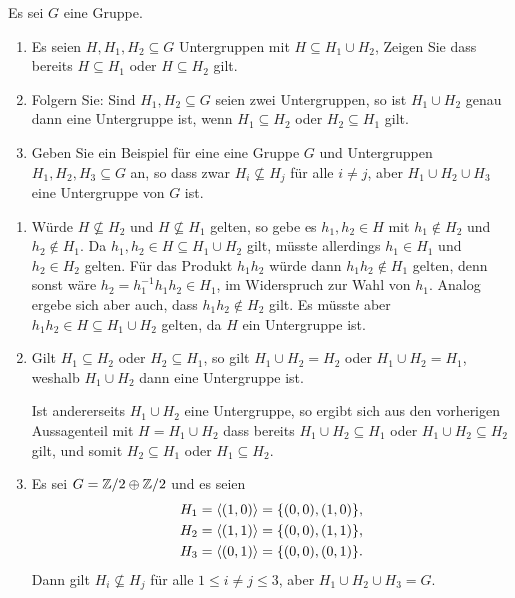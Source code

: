 \begin{question}[subtitle = Vereinigung von Untergruppen]
  Es sei $G$ eine Gruppe.
  \begin{enumerate}
    \item
      Es seien $H, H_1, H_2 \subseteq G$ Untergruppen mit $H \subseteq H_1 \cup H_2$,
      Zeigen Sie dass bereits $H \subseteq H_1$ oder $H \subseteq H_2$ gilt.
    \item
      Folgern Sie:
      Sind $H_1, H_2 \subseteq G$ seien zwei Untergruppen, so ist $H_1 \cup H_2$ genau dann eine Untergruppe ist, wenn $H_1 \subseteq H_2$ oder $H_2 \subseteq H_1$ gilt.
    \item
      Geben Sie ein Beispiel für eine eine Gruppe $G$ und Untergruppen $H_1, H_2, H_3 \subseteq G$ an, so dass zwar $H_i \nsubseteq H_j$ für alle $i \neq j$, aber $H_1 \cup H_2 \cup H_3$ eine Untergruppe von $G$ ist.
  \end{enumerate}
\end{question}


\begin{solution}
  \begin{enumerate}
    \item
      Würde $H \nsubseteq H_2$ und $H \nsubseteq H_1$ gelten, so gebe es $h_1, h_2 \in H$ mit $h_1 \notin H_2$ und $h_2 \notin H_1$.
      Da $h_1, h_2 \in H \subseteq H_1 \cup H_2$ gilt, müsste allerdings $h_1 \in H_1$ und $h_2 \in H_2$ gelten.
      Für das Produkt $h_1 h_2$ würde dann $h_1 h_2 \notin H_1$ gelten, denn sonst wäre $h_2 = h_1^{-1} h_1 h_2 \in H_1$, im Widerspruch zur Wahl von $h_1$.
      Analog ergebe sich aber auch, dass $h_1 h_2 \notin H_2$ gilt.
      Es müsste aber $h_1 h_2 \in H \subseteq H_1 \cup H_2$ gelten, da $H$ ein Untergruppe ist.
      
    \item
      Gilt $H_1 \subseteq H_2$ oder $H_2 \subseteq H_1$, so gilt $H_1 \cup H_2 = H_2$ oder $H_1 \cup H_2 = H_1$, weshalb $H_1 \cup H_2$ dann eine Untergruppe ist.
      
      Ist andererseits $H_1 \cup H_2$ eine Untergruppe, so ergibt sich aus den vorherigen Aussagenteil mit $H = H_1 \cup H_2$ dass bereits $H_1 \cup H_2 \subseteq H_1$ oder $H_1 \cup H_2 \subseteq H_2$ gilt, und somit $H_2 \subseteq H_1$ oder $H_1 \subseteq H_2$.
      
    \item
      Es sei $G = \mathbb{Z}/2 \oplus \mathbb{Z}/2$ und es seien
      \begin{align*}
        H_1 &= \langle (1,0) \rangle = \{ (0,0), (1,0) \},
        \\
        H_2 &= \langle (1,1) \rangle = \{ (0,0), (1,1) \},
        \\
        H_3 &= \langle (0,1) \rangle = \{ (0,0), (0,1) \}.
      \end{align*}
      Dann gilt $H_i \nsubseteq H_j$ für alle $1 \leq i \neq j \leq 3$, aber $H_1 \cup H_2 \cup H_3 = G$.
  \end{enumerate}
\end{solution}


